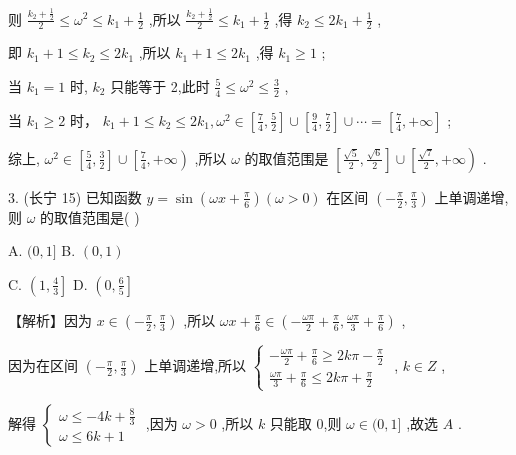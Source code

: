 \documentclass[10pt]{article}
\begin{document}
则 \(\frac{{k}_{2} + \frac{1}{2}}{2} \leq  {\omega }^{2} \leq  {k}_{1} + \frac{1}{2}\) ,所以 \(\frac{{k}_{2} + \frac{1}{2}}{2} \leq  {k}_{1} + \frac{1}{2}\) ,得 \({k}_{2} \leq  2{k}_{1} + \frac{1}{2}\) ,

即 \({k}_{1} + 1 \leq  {k}_{2} \leq  2{k}_{1}\) ,所以 \({k}_{1} + 1 \leq  2{k}_{1}\) ,得 \({k}_{1} \geq  1\) ;

当 \({k}_{1} = 1\) 时, \({k}_{2}\) 只能等于 2,此时 \(\frac{5}{4} \leq  {\omega }^{2} \leq  \frac{3}{2}\) ,

当 \({k}_{1} \geq  2\) 时， \({k}_{1} + 1 \leq  {k}_{2} \leq  2{k}_{1},{\omega }^{2} \in  \left\lbrack  {\frac{7}{4},\frac{5}{2}}\right\rbrack   \cup  \left\lbrack  {\frac{9}{4},\frac{7}{2}}\right\rbrack   \cup  \cdots  = \left\lbrack  {\frac{7}{4}, + \infty }\right\rbrack\) ;

综上, \({\omega }^{2} \in  \left\lbrack  {\frac{5}{4},\frac{3}{2}}\right\rbrack   \cup  \left\lbrack  {\frac{7}{4}, + \infty }\right)\) ,所以 \(\omega\) 的取值范围是 \(\left\lbrack  {\frac{\sqrt{5}}{2},\frac{\sqrt{6}}{2}}\right\rbrack   \cup  \left\lbrack  {\frac{\sqrt{7}}{2}, + \infty }\right)\) .

3. (长宁 15) 已知函数 \(y = \sin \left( {{\omega x} + \frac{\pi }{6}}\right) \left( {\omega  > 0}\right)\) 在区间 \(\left( {-\frac{\pi }{2},\frac{\pi }{3}}\right)\) 上单调递增,则 \(\omega\) 的取值范围是( )

A. \((0,1\rbrack\) B. \(\left( {0,1}\right)\)

C. \(\left( {1,\frac{4}{3}}\right\rbrack\) D. \(\left( {0,\frac{6}{5}}\right\rbrack\)

【解析】因为 \(x \in  \left( {-\frac{\pi }{2},\frac{\pi }{3}}\right)\) ,所以 \({\omega x} + \frac{\pi }{6} \in  \left( {-\frac{\omega \pi }{2} + \frac{\pi }{6},\frac{\omega \pi }{3} + \frac{\pi }{6}}\right)\) ,

因为在区间 \(\left( {-\frac{\pi }{2},\frac{\pi }{3}}\right)\) 上单调递增,所以 \(\left\{  \begin{array}{l}  - \frac{\omega \pi }{2} + \frac{\pi }{6} \geq  {2k\pi } - \frac{\pi }{2} \\  \frac{\omega \pi }{3} + \frac{\pi }{6} \leq  {2k\pi } + \frac{\pi }{2} \end{array}\right.\) , \(k \in  Z\) ,

解得 \(\left\{  \begin{array}{l} \omega  \leq   - {4k} + \frac{8}{3} \\  \omega  \leq  {6k} + 1 \end{array}\right.\) ,因为 \(\omega  > 0\) ,所以 \(k\) 只能取 0,则 \(\omega  \in  (0,1\rbrack\) ,故选 \(A\) .
\end{document}
